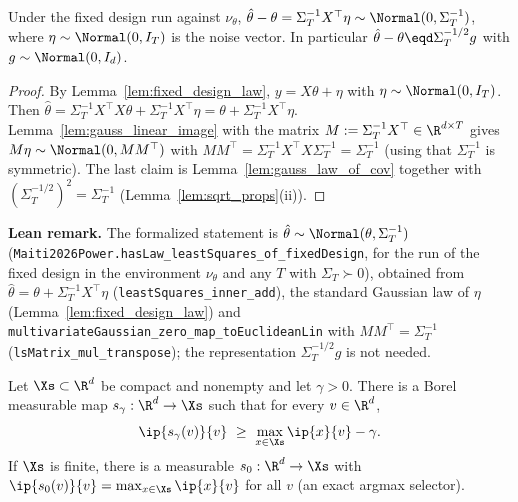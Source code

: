 \begin{lemma}\label{lem:least_squares_law}
\leanok
{}
Under the fixed design run against $\nu_\theta$,
$\hat\theta - \theta = \Sigma_T^{-1}X^\top\eta \sim \Normal(0,\Sigma_T^{-1})$, where
$\eta \sim \Normal(0,I_T)$ is the noise vector. In particular
$\hat\theta - \theta \eqd \Sigma_T^{-1/2}g$ with $g \sim \Normal(0,I_d)$.
\end{lemma}

\begin{proof}
\leanok
{}
By Lemma~\ref{lem:fixed_design_law}, $y = X\theta + \eta$ with $\eta \sim \Normal(0,I_T)$. Then
$\hat\theta = \Sigma_T^{-1}X^\top X\theta + \Sigma_T^{-1}X^\top\eta = \theta + \Sigma_T^{-1}X^\top\eta$.
Lemma~\ref{lem:gauss_linear_image} with the matrix $M := \Sigma_T^{-1}X^\top \in \R^{d\times T}$
gives $M\eta \sim \Normal(0, MM^\top)$ with $MM^\top = \Sigma_T^{-1}X^\top X\Sigma_T^{-1} =
\Sigma_T^{-1}$ (using that $\Sigma_T^{-1}$ is symmetric). The last claim is
Lemma~\ref{lem:gauss_law_of_cov} together with $(\Sigma_T^{-1/2})^2 = \Sigma_T^{-1}$
(Lemma~\ref{lem:sqrt_props}(ii)).
\end{proof}

\textbf{Lean remark.} The formalized statement is
$\hat\theta \sim \Normal(\theta, \Sigma_T^{-1})$ (\texttt{Maiti2026Power.hasLaw\_leastSquares\_of\_fixedDesign},
for the run of the fixed design in the environment $\nu_\theta$ and any $T$ with
$\Sigma_T \succ 0$), obtained from $\hat\theta = \theta + \Sigma_T^{-1}X^\top\eta$
(\texttt{leastSquares\_inner\_add}), the standard Gaussian law of $\eta$
(Lemma~\ref{lem:fixed_design_law}) and \texttt{multivariateGaussian\_zero\_map\_toEuclideanLin}
with $M M^\top = \Sigma_T^{-1}$ (\texttt{lsMatrix\_mul\_transpose}); the representation
$\Sigma_T^{-1/2}g$ is not needed.

\begin{lemma}\label{lem:approx_argmax_selector}
\leanok
{}
Let $\Xs \subset \R^d$ be compact and nonempty and let $\gamma > 0$. There is a Borel measurable
map $s_\gamma : \R^d \to \Xs$ such that for every $v \in \R^d$,
\[
  \ip{s_\gamma(v)}{v} \ \ge\ \max_{x\in\Xs}\ip{x}{v} - \gamma .
\]
If $\Xs$ is finite, there is a measurable $s_0 : \R^d \to \Xs$ with $\ip{s_0(v)}{v} =
\max_{x\in\Xs}\ip{x}{v}$ for all $v$ (an exact argmax selector).
\end{lemma}

